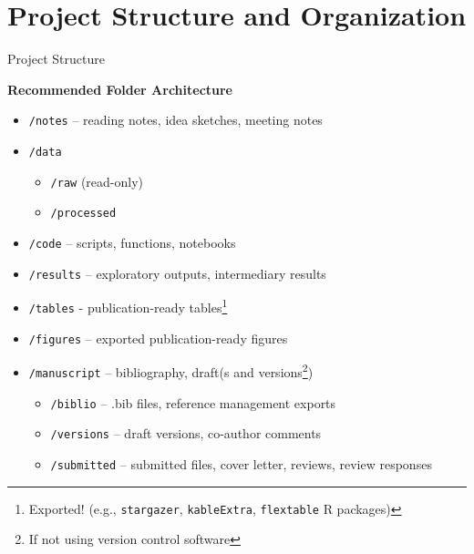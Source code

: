 \documentclass{beamer}
\begin{document}
\section{Project Structure and Organization}

\begin{frame}{Project Structure}

\vspace{0.5em}

\textbf{Recommended Folder Architecture}
    \scriptsize
    \begin{itemize}
        \item \texttt{/notes} – reading notes, idea sketches, meeting notes
        \item \texttt{/data}
            \begin{itemize}
                \scriptsize
                \item \texttt{/raw} (read-only)
                \item \texttt{/processed}
            \end{itemize}
        \item \texttt{/code} – scripts, functions, notebooks
        \item \texttt{/results} – exploratory outputs, intermediary results
        \item \texttt{/tables} - publication-ready tables\footnote{Exported!  (e.g., \texttt{stargazer}, \texttt{kableExtra}, \texttt{flextable} R packages)}
        \item \texttt{/figures} – exported publication-ready figures
        \item \texttt{/manuscript} – bibliography, draft(s and versions\footnote{If not using version control software})
            \begin{itemize}
                \scriptsize
                \item \texttt{/biblio} – .bib files, reference management exports
                \item \texttt{/versions} – draft versions, co-author comments
                \item \texttt{/submitted} – submitted files, cover letter, reviews, review responses
            \end{itemize}
    \end{itemize}

\end{frame}

\end{document}

